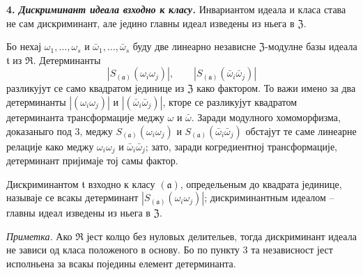 \documentclass[11pt]{article}
\begin{document}
\setcounter{footnote}{26}

\textbf{4. \emph{Дискриминант идеала взходно к класу.}} Инвариантом идеала и класа става не сам дискриминант, але једино главны идеал изведены из ньега в $\mathfrak Z$.

Бо нехај $\omega_1,\ldots,\omega_s$ и $\bar\omega_1,\ldots,\bar\omega_s$ буду две линеарно независне $\mathfrak Z$-модулне базы идеала $\mathfrak t$ из $\mathfrak R$. Детерминанты
\[
        |S_{(\mathfrak a)}(\omega_i\omega_j)|,
        \qquad
        |S_{(\mathfrak a)}(\bar\omega_i\bar\omega_j)|
\]
разликујут се само квадратом јединице из $\mathfrak Z$ како фактором. То важи имено за два детерминанты $|(\omega_i\omega_j)|$ и $|(\bar\omega_i\bar\omega_j)|$, кторе се разликујут квадратом детерминанта трансформације меджу $\omega$ и $\bar\omega$. Заради модулного хомоморфизма, доказаныго под 3, меджу $S_{(\mathfrak a)}(\omega_i\omega_j)$ и $S_{(\mathfrak a)}(\bar\omega_i\bar\omega_j)$ обстајут те саме линеарне релације како меджу $\omega_i\omega_j$ и $\bar\omega_i\bar\omega_j$; зато, заради когредиентној трансформације, детерминант пријимаје тој самы фактор.

Дискриминантом $\mathfrak t$ взходно к класу $(\mathfrak a)$, определьеным до квадрата јединице, называје се всакы детерминант $|S_{(\mathfrak a)}(\omega_i\omega_j)|$; дискриминантным идеалом -- главны идеал изведены из ньега в $\mathfrak Z$.

\emph{Приметка.} Ако $\mathfrak R$ јест колцо без нуловых делительев, тогда дискриминант идеала не зависи од класа положеного в основу. Бо по пункту 3 та независност јест исполньена за всакы поједины елемент детерминанта.
\end{document}
